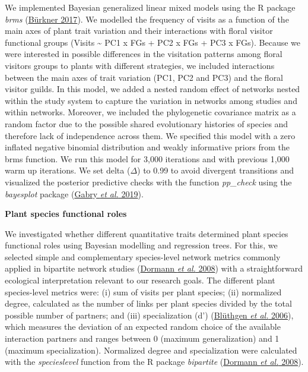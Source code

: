 \documentclass[
  12pt,
  a4paper,
]{article}
\begin{document}
We implemented Bayesian generalized linear mixed models using the R package \emph{brms} (\protect\hyperlink{ref-burkner2017}{Bürkner 2017}). We modelled the frequency of visits as a function of the main axes of plant trait variation and their interactions with floral visitor functional groups (Visits \textasciitilde{} PC1 x FGs + PC2 x FGs + PC3 x FGs). Because we were interested in possible differences in the visitation patterns among floral visitors groups to plants with different strategies, we included interactions between the main axes of trait variation (PC1, PC2 and PC3) and the floral visitor guilds. In this model, we added a nested random effect of networks nested within the study system to capture the variation in networks among studies and within networks. Moreover, we included the phylogenetic covariance matrix as a random factor due to the possible shared evolutionary histories of species and therefore lack of independence across them. We specified this model with a zero inflated negative binomial distribution and weakly informative priors from the brms function. We run this model for 3,000 iterations and with previous 1,000 warm up iterations. We set delta (\(\Delta\)) to 0.99 to avoid divergent transitions and visualized the posterior predictive checks with the function \emph{pp\_check} using the \emph{bayesplot} package (\protect\hyperlink{ref-gabry2019}{Gabry \emph{et al.} 2019}).

\textbf{Plant species functional roles}

We investigated whether different quantitative traits determined plant species functional roles using Bayesian modelling and regression trees. For this, we selected simple and complementary species-level network metrics commonly applied in bipartite network studies (\protect\hyperlink{ref-dormann2008}{Dormann \emph{et al.} 2008}) with a straightforward ecological interpretation relevant to our research goals. The different plant species-level metrics were: (i) sum of visits per plant species; (ii) normalized degree, calculated as the number of links per plant species divided by the total possible number of partners; and (iii) specialization (d') (\protect\hyperlink{ref-bluthgen2006}{Blüthgen \emph{et al.} 2006}), which measures the deviation of an expected random choice of the available interaction partners and ranges between 0 (maximum generalization) and 1 (maximum specialization). Normalized degree and specialization were calculated with the \emph{specieslevel} function from the R package \emph{bipartite} (\protect\hyperlink{ref-dormann2008}{Dormann \emph{et al.} 2008}).
\end{document}
